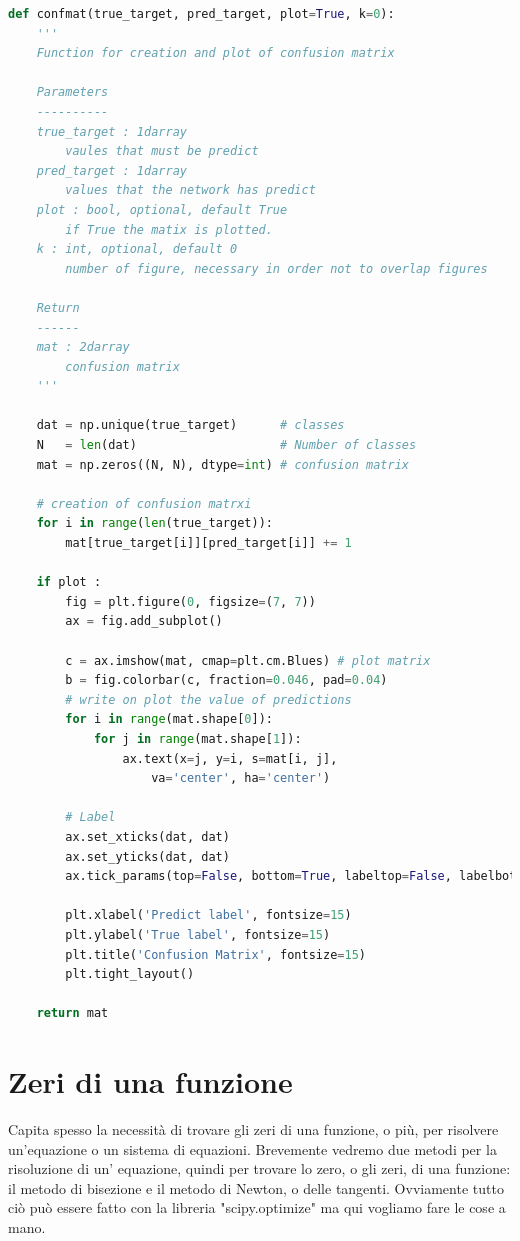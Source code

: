 \documentclass[10pt,a4paper]{article}
\begin{document}
\begin{lstlisting}[language=Python]
def confmat(true_target, pred_target, plot=True, k=0):
    '''
    Function for creation and plot of confusion matrix
        
    Parameters
    ----------
    true_target : 1darray
        vaules that must be predict
    pred_target : 1darray
        values that the network has predict
    plot : bool, optional, default True
        if True the matix is plotted. 
    k : int, optional, default 0
        number of figure, necessary in order not to overlap figures
        
    Return
    ------
    mat : 2darray
        confusion matrix
    '''
        
    dat = np.unique(true_target)      # classes
    N   = len(dat)                    # Number of classes 
    mat = np.zeros((N, N), dtype=int) # confusion matrix
        
    # creation of confusion matrxi
    for i in range(len(true_target)):
        mat[true_target[i]][pred_target[i]] += 1
       
    if plot :
        fig = plt.figure(0, figsize=(7, 7))
        ax = fig.add_subplot()
            
        c = ax.imshow(mat, cmap=plt.cm.Blues) # plot matrix
        b = fig.colorbar(c, fraction=0.046, pad=0.04)
        # write on plot the value of predictions
        for i in range(mat.shape[0]):
            for j in range(mat.shape[1]):
                ax.text(x=j, y=i, s=mat[i, j],
                    va='center', ha='center')
            
        # Label
        ax.set_xticks(dat, dat)
        ax.set_yticks(dat, dat)
        ax.tick_params(top=False, bottom=True, labeltop=False, labelbottom=True)

        plt.xlabel('Predict label', fontsize=15)
        plt.ylabel('True label', fontsize=15)
        plt.title('Confusion Matrix', fontsize=15)
        plt.tight_layout()
            
    return mat
\end{lstlisting}






\newpage

\appendix

\section{Zeri di una funzione}
Capita spesso la necessità di trovare gli zeri di una funzione, o più, per risolvere un'equazione o un sistema di equazioni. Brevemente vedremo due metodi per la risoluzione di un' equazione, quindi per trovare lo zero, o gli zeri, di una funzione: il metodo di bisezione e il metodo di Newton, o delle tangenti. Ovviamente tutto ciò può essere fatto con la libreria "scipy.optimize" ma qui vogliamo fare le cose a mano.
\end{document}
